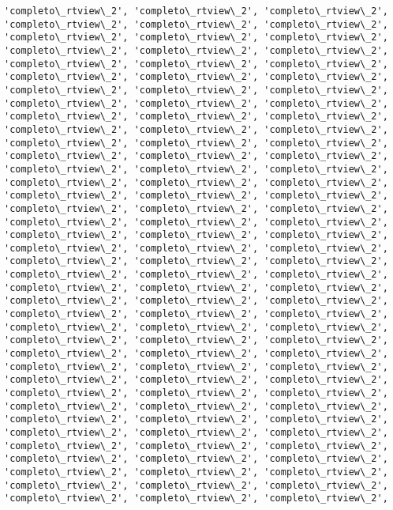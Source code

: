 \documentclass[11pt]{article}
\begin{document}
\begin{Verbatim}[commandchars=\\\{\}]
'completo\_rtview\_2', 'completo\_rtview\_2', 'completo\_rtview\_2',
'completo\_rtview\_2', 'completo\_rtview\_2', 'completo\_rtview\_2',
'completo\_rtview\_2', 'completo\_rtview\_2', 'completo\_rtview\_2',
'completo\_rtview\_2', 'completo\_rtview\_2', 'completo\_rtview\_2',
'completo\_rtview\_2', 'completo\_rtview\_2', 'completo\_rtview\_2',
'completo\_rtview\_2', 'completo\_rtview\_2', 'completo\_rtview\_2',
'completo\_rtview\_2', 'completo\_rtview\_2', 'completo\_rtview\_2',
'completo\_rtview\_2', 'completo\_rtview\_2', 'completo\_rtview\_2',
'completo\_rtview\_2', 'completo\_rtview\_2', 'completo\_rtview\_2',
'completo\_rtview\_2', 'completo\_rtview\_2', 'completo\_rtview\_2',
'completo\_rtview\_2', 'completo\_rtview\_2', 'completo\_rtview\_2',
'completo\_rtview\_2', 'completo\_rtview\_2', 'completo\_rtview\_2',
'completo\_rtview\_2', 'completo\_rtview\_2', 'completo\_rtview\_2',
'completo\_rtview\_2', 'completo\_rtview\_2', 'completo\_rtview\_2',
'completo\_rtview\_2', 'completo\_rtview\_2', 'completo\_rtview\_2',
'completo\_rtview\_2', 'completo\_rtview\_2', 'completo\_rtview\_2',
'completo\_rtview\_2', 'completo\_rtview\_2', 'completo\_rtview\_2',
'completo\_rtview\_2', 'completo\_rtview\_2', 'completo\_rtview\_2',
'completo\_rtview\_2', 'completo\_rtview\_2', 'completo\_rtview\_2',
'completo\_rtview\_2', 'completo\_rtview\_2', 'completo\_rtview\_2',
'completo\_rtview\_2', 'completo\_rtview\_2', 'completo\_rtview\_2',
'completo\_rtview\_2', 'completo\_rtview\_2', 'completo\_rtview\_2',
'completo\_rtview\_2', 'completo\_rtview\_2', 'completo\_rtview\_2',
'completo\_rtview\_2', 'completo\_rtview\_2', 'completo\_rtview\_2',
'completo\_rtview\_2', 'completo\_rtview\_2', 'completo\_rtview\_2',
'completo\_rtview\_2', 'completo\_rtview\_2', 'completo\_rtview\_2',
'completo\_rtview\_2', 'completo\_rtview\_2', 'completo\_rtview\_2',
'completo\_rtview\_2', 'completo\_rtview\_2', 'completo\_rtview\_2',
'completo\_rtview\_2', 'completo\_rtview\_2', 'completo\_rtview\_2',
'completo\_rtview\_2', 'completo\_rtview\_2', 'completo\_rtview\_2',
'completo\_rtview\_2', 'completo\_rtview\_2', 'completo\_rtview\_2',
'completo\_rtview\_2', 'completo\_rtview\_2', 'completo\_rtview\_2',
'completo\_rtview\_2', 'completo\_rtview\_2', 'completo\_rtview\_2',
'completo\_rtview\_2', 'completo\_rtview\_2', 'completo\_rtview\_2',
'completo\_rtview\_2', 'completo\_rtview\_2', 'completo\_rtview\_2',
'completo\_rtview\_2', 'completo\_rtview\_2', 'completo\_rtview\_2',
'completo\_rtview\_2', 'completo\_rtview\_2', 'completo\_rtview\_2',
'completo\_rtview\_2', 'completo\_rtview\_2', 'completo\_rtview\_2',

\end{Verbatim}
\end{document}
